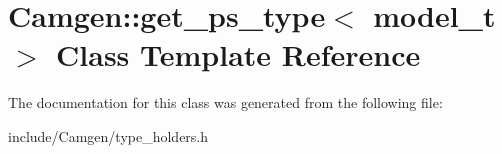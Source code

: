 \hypertarget{a00245}{\section{Camgen\-:\-:get\-\_\-ps\-\_\-type$<$ model\-\_\-t $>$ Class Template Reference}
\label{a00245}
}


The documentation for this class was generated from the following file\-:\begin{DoxyCompactItemize}
\item 
include/\-Camgen/type\-\_\-holders.\-h\end{DoxyCompactItemize}
